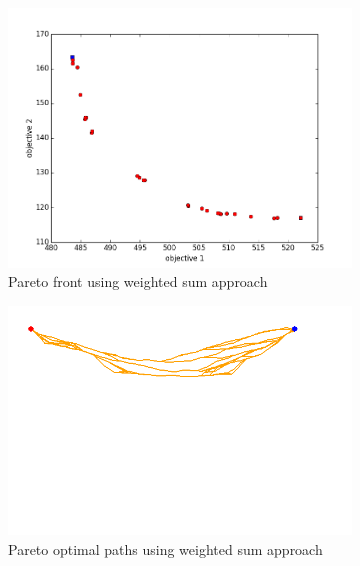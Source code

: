 \documentclass[conference]{IEEEtran}
\begin{document}
\begin{figure}
\begin{subfigure}[b]{0.45\linewidth}
		\includegraphics[width=\textwidth]{fig/sim4-obstacle/PF04-MORRT.png}
		\caption{Pareto front using weighted sum approach}
		\label{fig:sim:obs:pf:a}
	\end{subfigure}
	\begin{subfigure}[b]{0.45\linewidth}
		\centering
		\includegraphics[width=\textwidth]{fig/sim4-obstacle/MORRTstar01-ALL.png}
		\caption{Pareto optimal paths using weighted sum approach}
		\label{fig:sim:obs:sols:a}
	\end{subfigure}  \\
	\begin{subfigure}[b]{0.45\linewidth}
		\centering

\end{subfigure}
\end{figure}
\end{document}
